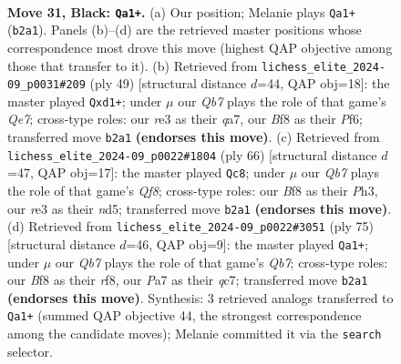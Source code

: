 \documentclass[11pt]{article}
\begin{document}
\clearpage

\begin{figure}[p]\centering
\begin{subfigure}{0.46\textwidth}\centering
\resizebox{\linewidth}{!}{%
\newchessgame
\chessboard[
  setfen={5b2/pp5p/6pk/8/8/PB2R1P1/1q3P1P/6K1 b - - 1 31},
  showmover=false,
  pgfstyle=straightmove, color=movearrow, markmove={b2-a1}
]}
\caption{}
\end{subfigure}\hfill
\begin{subfigure}{0.46\textwidth}\centering
\resizebox{\linewidth}{!}{%
\newchessgame
\chessboard[
  setfen={6k1/Q4p1p/5p2/5p2/8/6P1/P3qP1P/3R2K1 b - - 0 25},
  showmover=false,
  pgfstyle=straightmove, color=movearrow, markmove={e2-d1}
]}
\caption{}
\end{subfigure}
\\[4pt]
\begin{subfigure}{0.46\textwidth}\centering
\resizebox{\linewidth}{!}{%
\newchessgame
\chessboard[
  setfen={5Q2/4r1pk/1p2p3/3nB3/p5P1/7P/P4P2/6K1 w - - 1 34},
  showmover=false,
  pgfstyle=straightmove, color=movearrow, markmove={f8-c8}
]}
\caption{}
\end{subfigure}\hfill
\begin{subfigure}{0.46\textwidth}\centering
\resizebox{\linewidth}{!}{%
\newchessgame
\chessboard[
  setfen={5R2/2Q4p/6pk/8/5P2/4pBP1/Pq2P2P/6K1 b - - 0 38},
  showmover=false,
  pgfstyle=straightmove, color=movearrow, markmove={b2-a1}
]}
\caption{}
\end{subfigure}
\caption{\textbf{Move 31, Black: \texttt{Qa1+}.} (a) Our position; Melanie plays \texttt{Qa1+} (\texttt{b2a1}). Panels (b)--(d) are the retrieved master positions whose correspondence most drove this move (highest QAP objective among those that transfer to it). (b) Retrieved from \texttt{lichess\_elite\_2024-09\_p0031\#209} (ply 49) [structural distance $d$=44, QAP obj=18]: the master played \texttt{Qxd1+}; under $\mu$ our \emph{Qb7} plays the role of that game's \emph{Qe7}; cross-type roles: our \emph{r}e3 as their \emph{q}a7, our \emph{B}f8 as their \emph{P}f6; transferred move \texttt{b2a1} \textbf{(endorses this move)}. (c) Retrieved from \texttt{lichess\_elite\_2024-09\_p0022\#1804} (ply 66) [structural distance $d$=47, QAP obj=17]: the master played \texttt{Qc8}; under $\mu$ our \emph{Qb7} plays the role of that game's \emph{Qf8}; cross-type roles: our \emph{B}f8 as their \emph{P}h3, our \emph{r}e3 as their \emph{n}d5; transferred move \texttt{b2a1} \textbf{(endorses this move)}. (d) Retrieved from \texttt{lichess\_elite\_2024-09\_p0022\#3051} (ply 75) [structural distance $d$=46, QAP obj=9]: the master played \texttt{Qa1+}; under $\mu$ our \emph{Qb7} plays the role of that game's \emph{Qb7}; cross-type roles: our \emph{B}f8 as their \emph{r}f8, our \emph{P}a7 as their \emph{q}c7; transferred move \texttt{b2a1} \textbf{(endorses this move)}. Synthesis: 3 retrieved analogs transferred to \texttt{Qa1+} (summed QAP objective 44, the strongest correspondence among the candidate moves); Melanie committed it via the \texttt{search} selector.}
\label{fig:thought-m61}
\end{figure}
\end{document}
